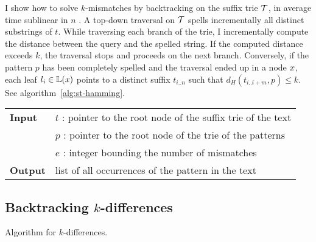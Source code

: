 I show how to solve $k$-mismatches by backtracking \citep{Ukkonen1993, Baeza1999} on the suffix trie $\mathcal {T}$, in average time sublinear in $n$ \citep{Navarro2000}.
A top-down traversal on $\mathcal {T}$ spells incrementally all distinct substrings of $t$.
While traversing each branch of the trie, I incrementally compute the distance between the query and the spelled string.
If the computed distance exceeds $k$, the traversal stops and proceeds on the next branch.
Conversely, if the pattern $p$ has been completely spelled and the traversal ended up in a node $x$, each leaf $l_i \in \mathbb {L}(x)$ points to a distinct suffix $t_{i..n}$ such that $d_H(t_{i..i+m}, p) \leq k$.
See algorithm~\ref{alg:st-hamming}.

\begin{center}
\begin{minipage}[t]{.8\textwidth}
\begin{algorithm}[H]
\begin{tabular}{ll}
\textbf{Input}  & $t$ : pointer to the root node of the suffix trie of the text\\
 			    & $p$ : pointer to the root node of the trie of the patterns\\
 			    & $e$ : integer bounding the number of mismatches\\
\textbf{Output} & list of all occurrences of the pattern in the text\\
\end{tabular}
\begin{algorithmic}[1]
		\State \Report {}
		\Repeat
			\State {}
			\State {}
			\State {}
		\Until {}
	\EndIf
\EndIf
\end{algorithmic}
\label{alg:st-hamming}
\end{algorithm}
\end{minipage}
\end{center}

\subsection{Backtracking $k$-differences}

Algorithm for $k$-differences.

